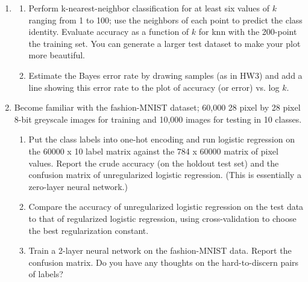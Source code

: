 \documentclass[12pt]{book}
\theoremstyle{definition}
\begin{document}
\begin{enumerate}
\item
\begin{enumerate} 
\item
Perform k-nearest-neighbor classification for at least six values of $k$ ranging from 1 to 100; use the neighbors of each point to predict the class identity.  Evaluate accuracy as a function of $k$ for knn with the 200-point the training set.   You can generate a larger test dataset to make your plot more beautiful.
\item Estimate the Bayes error rate by drawing samples (as in HW3) and add a line showing this error rate to the plot of accuracy (or error) vs. log $k$.

\end{enumerate}
\item
Become familiar with the fashion-MNIST dataset; 60,000 28 pixel by 28 pixel 8-bit greyscale images for training and 10,000 images for testing in 10 classes.
\begin{enumerate}
\item
Put the class labels into one-hot encoding and run logistic regression on the 60000 x 10 label matrix against the 784 x 60000 matrix of pixel values.
Report the crude accuracy (on the holdout test set) and the confusion matrix of unregularized logistic regression.  (This is essentially a zero-layer neural network.)

\item 
Compare the accuracy of unregularized logistic regression on the test data to that of regularized logistic regression, using cross-validation to choose the best regularization constant.


\item 
Train a 2-layer neural network on the fashion-MNIST data. Report the confusion matrix. Do you have any thoughts on the hard-to-discern pairs of labels?



\end{enumerate}
\end{enumerate}
\end{document}
